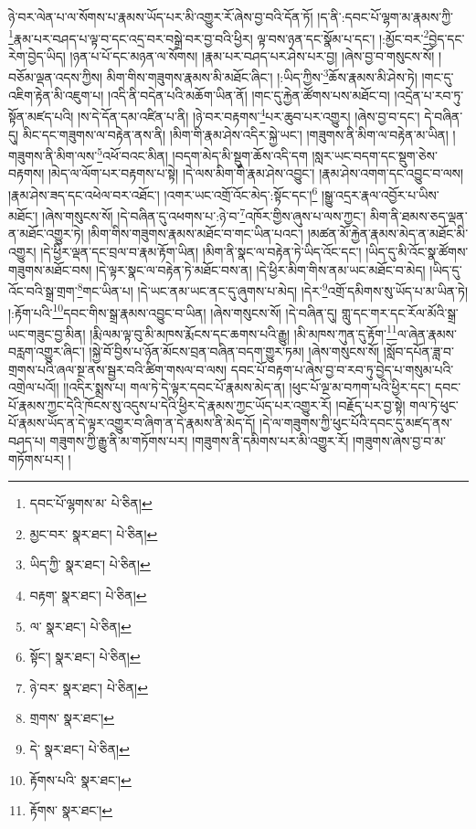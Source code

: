 ཉེ་བར་ལེན་པ་ལ་སོགས་པ་རྣམས་ཡོད་པར་མི་འགྱུར་རོ་ཞེས་བྱ་བའི་དོན་ཏོ། །ད་ནི་:དབང་པོ་ལྷག་མ་རྣམས་ཀྱི་\footnote{དབང་པོ་ལྷགས་མ་  པེ་ཅིན། }རྣམ་པར་བཤད་པ་ལྟ་བ་དང་འདྲ་བར་བསྒྲེ་བར་བྱ་བའི་ཕྱིར། ལྟ་བས་ཉན་དང་སྣོམ་པ་དང་། །:མྱོང་བར་\footnote{མྱང་བར་  སྣར་ཐང་།  པེ་ཅིན། }བྱེད་དང་རེག་བྱེད་ཡིད། །ཉན་པ་པོ་དང་མཉན་ལ་སོགས། །རྣམ་པར་བཤད་པར་ཤེས་པར་བྱ། །ཞེས་བྱ་བ་གསུངས་སོ། །བཅོམ་ལྡན་འདས་ཀྱིས། མིག་གིས་གཟུགས་རྣམས་མི་མཐོང་ཞིང་། །:ཡིད་ཀྱིས་\footnote{ཡིད་ཀྱི་  སྣར་ཐང་།  པེ་ཅིན། }ཆོས་རྣམས་མི་ཤེས་ཏེ། །གང་དུ་འཇིག་རྟེན་མི་འཇུག་པ། །འདི་ནི་བདེན་པའི་མཆོག་ཡིན་ནོ། །གང་དུ་རྐྱེན་ཚོགས་པས་མཐོང་བ། །འདྲེན་པ་རབ་ཏུ་སྟོན་མཛད་པའི། །ས་དེ་དོན་དམ་འཛིན་པ་ནི། །ཉེ་བར་བརྟགས་\footnote{བརྟག་  སྣར་ཐང་།  པེ་ཅིན། }པར་ཆུབ་པར་འགྱུར། །ཞེས་བྱ་བ་དང་། དེ་བཞིན་དུ། མིང་དང་གཟུགས་ལ་བརྟེན་ནས་ནི། །མིག་གི་རྣམ་ཤེས་འདིར་སྐྱེ་ཡང་། །གཟུགས་ནི་མིག་ལ་བརྟེན་མ་ཡིན། །གཟུགས་ནི་མིག་ལས་\footnote{ལ་  སྣར་ཐང་།  པེ་ཅིན། }འཕོ་བའང་མིན། །བདག་མེད་མི་སྡུག་ཆོས་འདི་དག །སླར་ཡང་བདག་དང་སྡུག་ཅེས་བརྟགས། །མེད་ལ་ལོག་པར་བརྟགས་པ་སྟེ། །དེ་ལས་མིག་གི་རྣམ་ཤེས་འབྱུང་། །རྣམ་ཤེས་འགག་དང་འབྱུང་བ་ལས། །རྣམ་ཤེས་ཟད་དང་འཕེལ་བར་འཐོང་། །འགར་ཡང་འགྲོ་འོང་མེད་:སྟོང་དང་།\footnote{སྟོང་།  སྣར་ཐང་།  པེ་ཅིན། } །སྒྱུ་འདྲར་རྣལ་འབྱོར་པ་ཡིས་མཐོང་། །ཞེས་གསུངས་སོ། །དེ་བཞིན་དུ་འཕགས་པ་:ཉེ་བ་\footnote{ཉེ་བར་  སྣར་ཐང་།  པེ་ཅིན། }འཁོར་གྱིས་ཞུས་པ་ལས་ཀྱང་། མིག་ནི་ཐམས་ཅད་ལྡན་ན་མཐོང་འགྱུར་ཏེ། །མིག་གིས་གཟུགས་རྣམས་མཐོང་བ་གང་ཡིན་པའང་། །མཚན་མོ་རྐྱེན་རྣམས་མེད་ན་མཐོང་མི་འགྱུར། །དེ་ཕྱིར་ལྡན་དང་བྲལ་བ་རྣམ་རྟོག་ཡིན། །མིག་ནི་སྣང་ལ་བརྟེན་ཏེ་ཡིད་འོང་དང་། །ཡིད་དུ་མི་འོང་སྣ་ཚོགས་གཟུགས་མཐོང་བས། །དེ་ལྟར་སྣང་ལ་བརྟེན་ཏེ་མཐོང་བས་ན། །དེ་ཕྱིར་མིག་གིས་ནམ་ཡང་མཐོང་བ་མེད། །ཡིད་དུ་འོང་བའི་སྒྲ་གྲག་\footnote{གྲགས་  སྣར་ཐང་། }གང་ཡིན་པ། །དེ་ཡང་ནམ་ཡང་ནང་དུ་ཞུགས་པ་མེད། །དེར་\footnote{དེ་  སྣར་ཐང་།  པེ་ཅིན། }འགྲོ་དམིགས་སུ་ཡོད་པ་མ་ཡིན་ཏེ། །:རྟོག་པའི་\footnote{རྟོགས་པའི་  སྣར་ཐང་། }དབང་གིས་སྒྲ་རྣམས་འབྱུང་བ་ཡིན། །ཞེས་གསུངས་སོ། །དེ་བཞིན་དུ། གླུ་དང་གར་དང་རོལ་མོའི་སྒྲ་ཡང་གཟུང་བྱ་མིན། །རྨི་ལམ་ལྟ་བུ་མི་མཁས་རྨོངས་དང་ཆགས་པའི་རྒྱུ། །མི་མཁས་ཀུན་དུ་རྟོག་\footnote{རྟོགས་  སྣར་ཐང་། }ལ་ཞེན་རྣམས་བརླག་འགྱུར་ཞིང་། །སྐྱེ་བོ་བྱིས་པ་ཉོན་མོངས་བྲན་བཞིན་བདག་གྱུར་ཏམ། །ཞེས་གསུངས་སོ། །སློབ་དཔོན་ཟླ་བ་གྲགས་པའི་ཞལ་སྔ་ནས་སྦྱར་བའི་ཚིག་གསལ་བ་ལས། དབང་པོ་བརྟག་པ་ཞེས་བྱ་བ་རབ་ཏུ་བྱེད་པ་གསུམ་པའི་འགྲེལ་པའོ།། །།འདིར་སྨྲས་པ། གལ་ཏེ་དེ་ལྟར་དབང་པོ་རྣམས་མེད་ན། །ཕུང་པོ་ལྔ་མ་བཀག་པའི་ཕྱིར་དང་། དབང་པོ་རྣམས་ཀྱང་དེའི་ཁོངས་སུ་འདུས་པ་དེའི་ཕྱིར་དེ་རྣམས་ཀྱང་ཡོད་པར་འགྱུར་རོ། །བརྗོད་པར་བྱ་སྟེ། གལ་ཏེ་ཕུང་པོ་རྣམས་ཡོད་ན་དེ་ལྟར་འགྱུར་བ་ཞིག་ན་དེ་རྣམས་ནི་མེད་དོ། །དེ་ལ་གཟུགས་ཀྱི་ཕུང་པོའི་དབང་དུ་མཛད་ནས་བཤད་པ། གཟུགས་ཀྱི་རྒྱུ་ནི་མ་གཏོགས་པར། །གཟུགས་ནི་དམིགས་པར་མི་འགྱུར་རོ། །གཟུགས་ཞེས་བྱ་བ་མ་གཏོགས་པར། །
